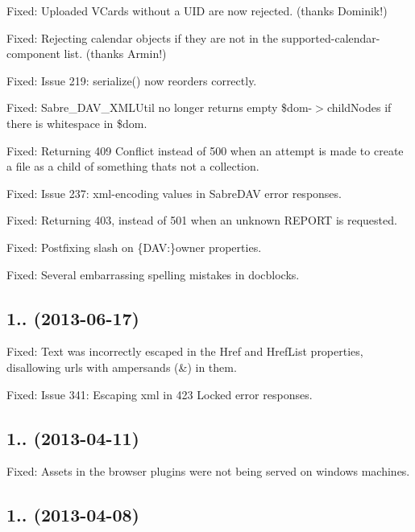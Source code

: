 \begin{DoxyItemize}
\item Fixed\+: Uploaded V\+Cards without a U\+ID are now rejected. (thanks Dominik!)
\item Fixed\+: Rejecting calendar objects if they are not in the supported-\/calendar-\/component list. (thanks Armin!)
\item Fixed\+: Issue 219\+: serialize() now reorders correctly.
\item Fixed\+: Sabre\+\_\+\+D\+A\+V\+\_\+\+X\+M\+L\+Util no longer returns empty \$dom-\/$>$child\+Nodes if there is whitespace in \$dom.
\item Fixed\+: Returning 409 Conflict instead of 500 when an attempt is made to create a file as a child of something that\textquotesingle{}s not a collection.
\item Fixed\+: Issue 237\+: xml-\/encoding values in Sabre\+D\+AV error responses.
\item Fixed\+: Returning 403, instead of 501 when an unknown R\+E\+P\+O\+RT is requested.
\item Fixed\+: Postfixing slash on \{D\+AV\+:\}owner properties.
\item Fixed\+: Several embarrassing spelling mistakes in docblocks.
\end{DoxyItemize}

\subsection*{1.. (2013-\/06-\/17) }


\begin{DoxyItemize}
\item Fixed\+: Text was incorrectly escaped in the Href and Href\+List properties, disallowing urls with ampersands (\&) in them.
\item Fixed\+: Issue 341\+: Escaping xml in 423 Locked error responses.
\end{DoxyItemize}

\subsection*{1.. (2013-\/04-\/11) }


\begin{DoxyItemize}
\item Fixed\+: Assets in the browser plugins were not being served on windows machines.
\end{DoxyItemize}

\subsection*{1.. (2013-\/04-\/08) }


